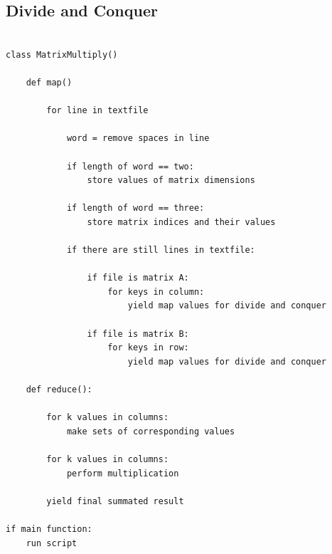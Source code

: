 \documentclass[conference]{IEEEtran}
\begin{document}
\subsection{Divide and Conquer}
\begin{verbatim}

class MatrixMultiply()

    def map()
    
        for line in textfile
        
            word = remove spaces in line
		
            if length of word == two:
                store values of matrix dimensions
			
            if length of word == three:
                store matrix indices and their values
			
            if there are still lines in textfile:
			
                if file is matrix A:
                    for keys in column:
                        yield map values for divide and conquer
						
                if file is matrix B:
                    for keys in row:
                        yield map values for divide and conquer

    def reduce():
    
        for k values in columns:
            make sets of corresponding values 
		
        for k values in columns:
            perform multiplication
		
        yield final summated result

if main function:
    run script

\end{verbatim}


\end{document}

